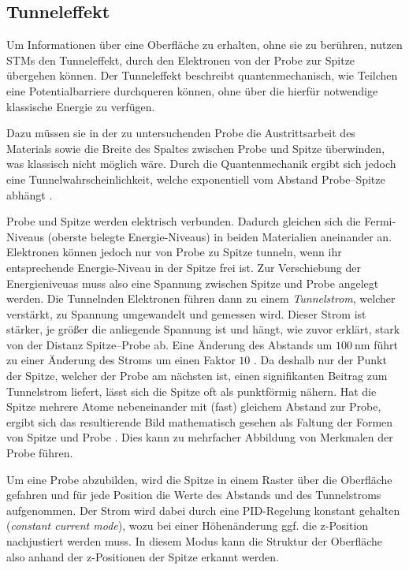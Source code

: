 \documentclass{article}
\begin{document}
\subsection*{Tunneleffekt} 
Um Informationen über eine Oberfläche zu erhalten, ohne sie zu berühren, nutzen STMs den
Tunneleffekt, durch den Elektronen von der Probe zur Spitze übergehen können.
Der Tunneleffekt beschreibt quantenmechanisch, wie Teilchen eine Potentialbarriere durchqueren können, ohne über die hierfür notwendige klassische Energie zu verfügen.

Dazu müssen sie in der zu untersuchenden Probe die Austrittsarbeit des Materials 
sowie  die Breite des Spaltes zwischen Probe und Spitze überwinden,
was klassisch nicht möglich wäre. Durch die Quantenmechanik ergibt sich jedoch eine
Tunnelwahrscheinlichkeit, welche exponentiell vom Abstand Probe--Spitze abhängt \cite{stm-paper}.

Probe und Spitze werden elektrisch verbunden. Dadurch gleichen sich die Fermi-Niveaus (oberste belegte Energie-Niveaus) in beiden Materialien aneinander an.
Elektronen können jedoch nur von Probe zu Spitze tunneln, wenn ihr entsprechende Energie-Niveau
in der Spitze frei ist. Zur Verschiebung der Energieniveuas muss also eine Spannung zwischen Spitze und Probe angelegt werden.
Die Tunnelnden Elektronen führen dann zu einem \textit{Tunnelstrom}, welcher verstärkt,
zu Spannung umgewandelt und gemessen wird. Dieser Strom ist stärker, je größer die
anliegende Spannung ist und hängt,
wie zuvor erklärt, stark von der Distanz Spitze--Probe ab. Eine Änderung des Abstands
um $\SI{100}{\nm}$ führt zu einer Änderung des Stroms um einen Faktor $10$ \cite{naio-video}.
Da deshalb nur der Punkt der Spitze, welcher der Probe am nächsten ist, einen signifikanten Beitrag zum Tunnelstrom liefert,
lässt sich die Spitze oft als punktförmig nähern.
Hat die Spitze mehrere Atome nebeneinander mit (fast) gleichem Abstand zur Probe,
ergibt sich das resultierende Bild mathematisch gesehen als Faltung der Formen
von Spitze und Probe \cite{Anleitung}. Dies kann zu mehrfacher Abbildung von 
Merkmalen der Probe führen.

Um eine Probe abzubilden, wird die Spitze in einem Raster über die Oberfläche 
gefahren und für jede Position die Werte des Abstands und des Tunnelstroms aufgenommen.
Der Strom wird dabei durch eine PID-Regelung konstant gehalten (\textit{constant current mode}), wozu bei einer Höhenänderung ggf. die z-Position nachjustiert werden muss. In diesem Modus kann die Struktur der Oberfläche also anhand der z-Positionen
der Spitze erkannt werden.
\end{document}
